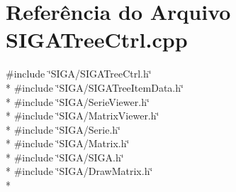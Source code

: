 \section{Referência do Arquivo S\+I\+G\+A\+Tree\+Ctrl.\+cpp}
\label{_s_i_g_a_tree_ctrl_8cpp}
{\ttfamily \#include \char`\"{}S\+I\+G\+A/\+S\+I\+G\+A\+Tree\+Ctrl.\+h\char`\"{}}\\*
{\ttfamily \#include \char`\"{}S\+I\+G\+A/\+S\+I\+G\+A\+Tree\+Item\+Data.\+h\char`\"{}}\\*
{\ttfamily \#include \char`\"{}S\+I\+G\+A/\+Serie\+Viewer.\+h\char`\"{}}\\*
{\ttfamily \#include \char`\"{}S\+I\+G\+A/\+Matrix\+Viewer.\+h\char`\"{}}\\*
{\ttfamily \#include \char`\"{}S\+I\+G\+A/\+Serie.\+h\char`\"{}}\\*
{\ttfamily \#include \char`\"{}S\+I\+G\+A/\+Matrix.\+h\char`\"{}}\\*
{\ttfamily \#include \char`\"{}S\+I\+G\+A/\+S\+I\+G\+A.\+h\char`\"{}}\\*
{\ttfamily \#include \char`\"{}S\+I\+G\+A/\+Draw\+Matrix.\+h\char`\"{}}\\*
